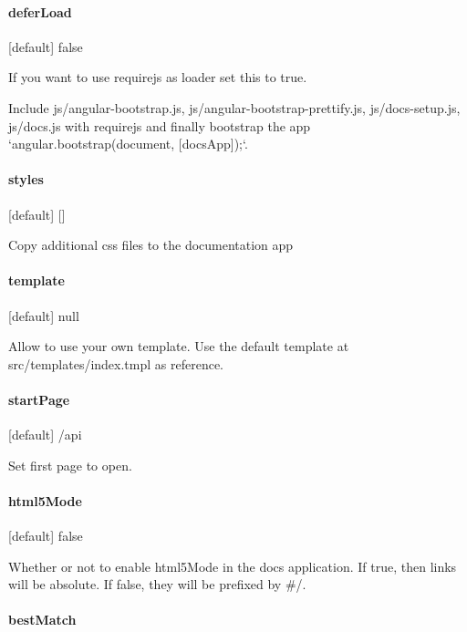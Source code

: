 \paragraph*{defer\+Load}

\mbox{[}default\mbox{]} false

If you want to use requirejs as loader set this to {\ttfamily true}.

Include \textquotesingle{}js/angular-\/bootstrap.\+js\textquotesingle{}, \textquotesingle{}js/angular-\/bootstrap-\/prettify.\+js\textquotesingle{}, \textquotesingle{}js/docs-\/setup.\+js\textquotesingle{}, \textquotesingle{}js/docs.\+js\textquotesingle{} with requirejs and finally bootstrap the app `angular.bootstrap(document, \mbox{[}\textquotesingle{}docs\+App\textquotesingle{}\mbox{]});`.

\paragraph*{styles}

\mbox{[}default\mbox{]} \mbox{[}\mbox{]}

Copy additional css files to the documentation app

\paragraph*{template}

\mbox{[}default\mbox{]} null

Allow to use your own template. Use the default template at src/templates/index.\+tmpl as reference.

\paragraph*{start\+Page}

\mbox{[}default\mbox{]} \textquotesingle{}/api\textquotesingle{}

Set first page to open.

\paragraph*{html5\+Mode}

\mbox{[}default\mbox{]} false

Whether or not to enable {\ttfamily html5\+Mode} in the docs application. If true, then links will be absolute. If false, they will be prefixed by {\ttfamily \#/}.

\paragraph*{best\+Match}

